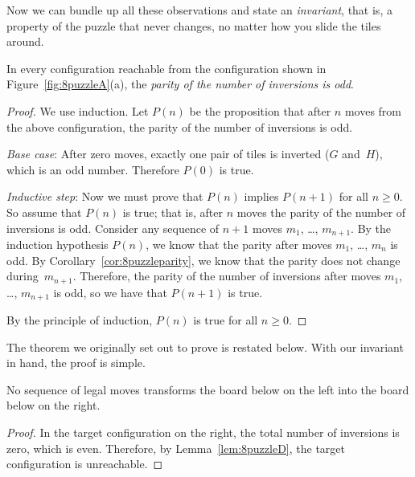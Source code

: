 Now we can bundle up all these observations and state an
\emph{invariant}, that is, a property of the puzzle that never
changes, no matter how you slide the tiles around.

\begin{lemma}\label{lem:8puzzleD}
In every configuration reachable from the configuration shown in
Figure~\ref{fig:8puzzleA}(a), the \emph{parity of the number of inversions
  is odd}.
\end{lemma}

\begin{proof}
We use induction.  Let $P(n)$ be the proposition that after $n$ moves
from the above configuration, the parity of the number of inversions
is odd.

\emph{Base case}: After zero moves, exactly one pair of tiles is
inverted ($G$ and~$H$), which is an odd number.  Therefore $P(0)$ is
true.

\emph{Inductive step}:
Now we must prove that $P(n)$ implies $P(n+1)$ for all $n \ge 0$.  So
assume that $P(n)$ is true; that is, after $n$ moves the parity of the
number of inversions is odd.  Consider any sequence of $n+1$ moves
$m_1$, \dots, $m_{n+1}$.  By the induction hypothesis $P(n)$, we know
that the parity after moves $m_1$, \dots, $m_{n}$ is odd.  By
Corollary~\ref{cor:8puzzleparity}, we know that the parity does not
change during~$m_{n+1}$.  Therefore, the parity of the number of
inversions after moves $m_1$, \dots, $m_{n+1}$ is odd, so we have that
$P(n + 1)$ is true.

By the principle of induction, $P(n)$ is true for all $n \ge 0$.
\end{proof}

The theorem we originally set out to prove is restated below.  With our
invariant in hand, the proof is simple.
\begin{theorem*}
No sequence of legal moves transforms the board below on the left into
the board below on the right.
\begin{figure}[h]
\qquad
{}
\end{figure}
\end{theorem*}

\begin{proof}
In the target configuration on the right, the total number of
inversions is zero, which is even.  Therefore, by
Lemma~\ref{lem:8puzzleD}, the target configuration is unreachable.
\end{proof}

